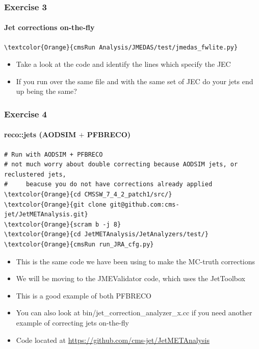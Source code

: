 \begin{frame}[fragile]
	\frametitle{Exercise 3}
	\framesubtitle{Jet corrections on-the-fly}

\begin{Verbatim}[label={Exercise 3}]
\textcolor{Orange}{cmsRun Analysis/JMEDAS/test/jmedas_fwlite.py}
\end{Verbatim}

\begin{block}{}
	\begin{itemize}
		\item Take a look at the code and identify the lines which specify the JEC
		\item If you run over the same file and with the same set of JEC do your jets end up being the same?
	\end{itemize}
\end{block}

\end{frame}

\begin{frame}[fragile]
	\frametitle{Exercise 4}
	\framesubtitle{reco::jets (AODSIM $+$ PFBRECO)}

\begin{Verbatim}[label={Exercise 4}]
# Run with AODSIM + PFBRECO
# not much worry about double correcting because AODSIM jets, or reclustered jets,
#     beacuse you do not have corrections already applied
\textcolor{Orange}{cd CMSSW_7_4_2_patch1/src/}
\textcolor{Orange}{git clone git@github.com:cms-jet/JetMETAnalysis.git}
\textcolor{Orange}{scram b -j 8}
\textcolor{Orange}{cd JetMETAnalysis/JetAnalyzers/test/}
\textcolor{Orange}{cmsRun run_JRA_cfg.py}
\end{Verbatim}

\begin{block}{}
	\begin{itemize}
		\item This is the same code we have been using to make the MC-truth corrections
		\item We will be moving to the JMEValidator code, which uses the JetToolbox
		\item This is a good example of both PFBRECO
		\item You can also look at bin/jet\_correction\_analyzer\_x.cc if you need another example of correcting jets on-the-fly
		\item Code located at \href{https://github.com/cms-jet/JetMETAnalysis}{https://github.com/cms-jet/JetMETAnalysis}
	\end{itemize}
\end{block}

\end{frame}

